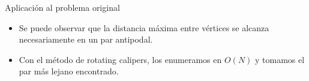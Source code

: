 \documentclass[compress]{beamer}
\begin{document}
\begin{frame}{Aplicación al problema original}
    \begin{itemize}
        \item Se puede observar que la distancia máxima entre vértices se alcanza necesariamente en un par antipodal.
        \item Con el método de rotating calipers, los enumeramos en $O(N)$ y tomamos el par más lejano encontrado.
    \end{itemize}
\end{frame}
\end{document}
